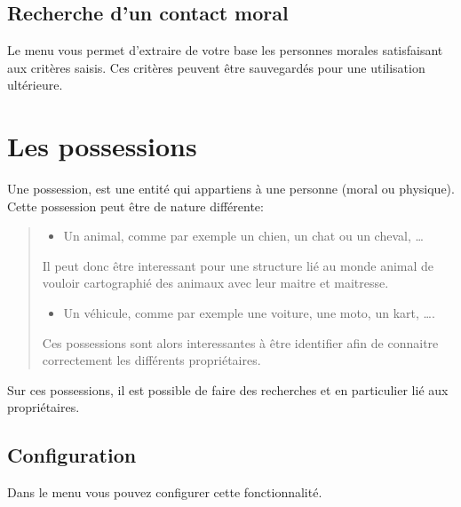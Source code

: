 \documentclass[letterpaper,10pt,french]{sphinxmanual}
\let\sphinxpxdimen\pdfpxdimen\else\newdimen\sphinxpxdimen
\begin{document}
\subsection{Recherche d’un contact moral}
\label{\detokenize{contacts/legal_entity:recherche-d-un-contact-moral}}
\sphinxAtStartPar
Le menu  vous permet d’extraire de votre base les personnes morales satisfaisant aux critères saisis. Ces critères peuvent être sauvegardés pour une utilisation ultérieure.

\noindent{\hspace*{\fill}\sphinxincludegraphics[height=400\sphinxpxdimen]{{FindLegalEntity}.png}\hspace*{\fill}}

\sphinxstepscope


\section{Les possessions}
\label{\detokenize{contacts/possession:les-possessions}}\label{\detokenize{contacts/possession::doc}}
\sphinxAtStartPar
Une possession, est une entité qui appartiens à une personne (moral ou physique).
Cette possession peut être de nature différente:
\begin{quote}
\begin{itemize}
\item {} 
\sphinxAtStartPar
Un animal, comme par exemple un chien, un chat ou un cheval, …

\end{itemize}

\sphinxAtStartPar
Il peut donc être interessant pour une structure lié au monde animal de vouloir cartographié des animaux avec leur maitre et maitresse.
\begin{itemize}
\item {} 
\sphinxAtStartPar
Un véhicule, comme par exemple une voiture, une moto, un kart, ….

\end{itemize}

\sphinxAtStartPar
Ces possessions sont alors interessantes à être identifier afin de connaitre correctement les différents propriétaires.
\end{quote}

\sphinxAtStartPar
Sur ces possessions, il est possible de faire des recherches et en particulier lié aux propriétaires.


\subsection{Configuration}
\label{\detokenize{contacts/possession:configuration}}
\sphinxAtStartPar
Dans le menu  vous pouvez configurer cette fonctionnalité.
\end{document}
